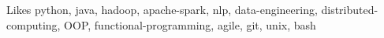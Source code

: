 

\begin{cvskills}

  \cvskill
    {Likes} %
    {python, java, hadoop, apache-spark, nlp, data-engineering, distributed-computing, OOP, functional-programming, agile, git, unix, bash} %


\end{cvskills}
